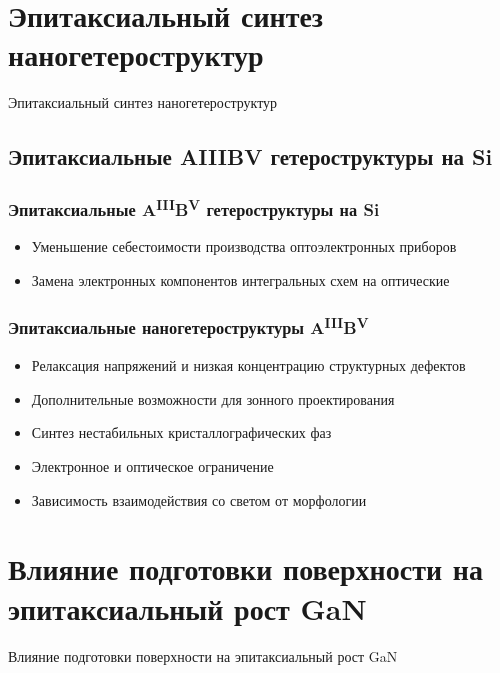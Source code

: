 \section{Эпитаксиальный синтез наногетероструктур}
\begin{frame}
	\begin{center}
		\Huge
		Эпитаксиальный синтез наногетероструктур
	\end{center}
\end{frame}

\subsection{Эпитаксиальные AIIIBV гетероструктуры на Si}

\begin{frame}
	\frametitle{Эпитаксиальные A\textsuperscript{III}B\textsuperscript{V} гетероструктуры на Si}
	\begin{itemize}
		\item Уменьшение себестоимости производства оптоэлектронных приборов
		\item Замена электронных компонентов интегральных схем на оптические
	\end{itemize}
\end{frame}

\begin{frame}
	\frametitle{Эпитаксиальные наногетероструктуры A\textsuperscript{III}B\textsuperscript{V}}
	\begin{itemize}
		\item Релаксация напряжений и низкая концентрацию структурных дефектов
		\item Дополнительные возможности для зонного проектирования
		\item Синтез нестабильных кристаллографических фаз
		\item Электронное и оптическое ограничение
		\item Зависимость взаимодействия со светом от морфологии
	\end{itemize}
\end{frame}

\section{Влияние подготовки поверхности на эпитаксиальный рост GaN}
\begin{frame}
	\begin{center}
		\Huge
		Влияние подготовки поверхности на эпитаксиальный рост GaN
	\end{center}
\end{frame}


